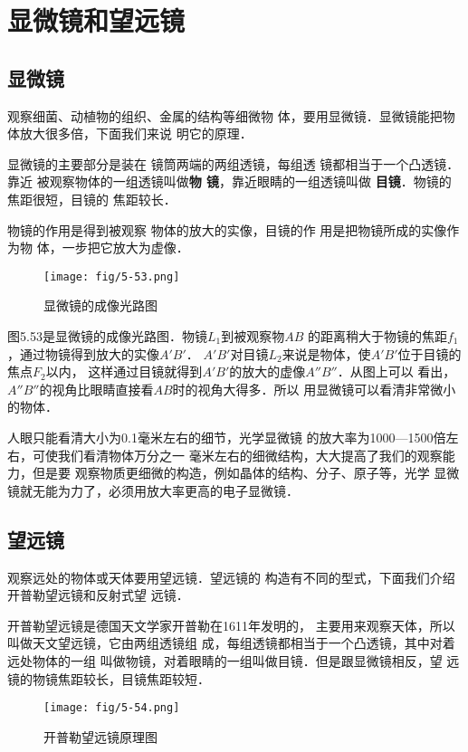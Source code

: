 \section{显微镜和望远镜}
\subsection{显微镜}

观察细菌、动植物的组织、金属的结构等细微物
体，要用显微镜．显微镜能把物体放大很多倍，下面我们来说
明它的原理．

显微镜的主要部分是装在
镜筒两端的两组透镜，每组透
镜都相当于一个凸透镜．靠近
被观察物体的一组透镜叫做\textbf{物
镜}，靠近眼睛的一组透镜叫做
\textbf{目镜}．物镜的焦距很短，目镜的
焦距较长．

物镜的作用是得到被观察
物体的放大的实像，目镜的作
用是把物镜所成的实像作为物
体，一步把它放大为虚像．

\begin{figure}[htp]\centering
    \texttt{[image: fig/5-53.png]}
    \caption{显微镜的成像光路图}
    \end{figure}

图5.53是显微镜的成像光路图．物镜$L_1$到被观察物$AB$
的距离稍大于物镜的焦距$f_1$，通过物镜得到放大的实像$A'B'$．
$A'B'$对目镜$L_2$来说是物体，使$A'B'$位于目镜的焦点$F_2$以内，
这样通过目镜就得到$A'B'$的放大的虚像$A''B''$．从图上可以
看出，$A''B''$的视角比眼睛直接看$AB$时的视角大得多．所以
用显微镜可以看清非常微小的物体．

人眼只能看清大小为0.1毫米左右的细节，光学显微镜
的放大率为1000—1500倍左右，可使我们看清物体万分之一
毫米左右的细微结构，大大提高了我们的观察能力，但是要
观察物质更细微的构造，例如晶体的结构、分子、原子等，光学
显微镜就无能为力了，必须用放大率更高的电子显微镜．

\subsection{望远镜}

观察远处的物体或天体要用望远镜．望远镜的
构造有不同的型式，下面我们介绍开普勒望远镜和反射式望
远镜．

开普勒望远镜是德国天文学家开普勒在1611年发明的，
主要用来观察天体，所以叫做天文望远镜，它由两组透镜组
成，每组透镜都相当于一个凸透镜，其中对着远处物体的一组
叫做物镜，对着眼睛的一组叫做目镜．但是跟显微镜相反，望
远镜的物镜焦距较长，目镜焦距较短．
\begin{figure}[htp]\centering
    \texttt{[image: fig/5-54.png]}
    \caption{开普勒望远镜原理图}
    \end{figure}

